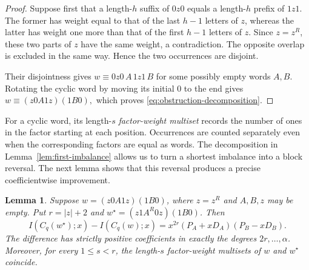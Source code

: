 \documentclass[11pt]{article}
\newtheorem{lemma}[lemma]{Lemma}
\theoremstyle{definition}
\begin{document}
\begin{proof}
Suppose first that a length-$h$ suffix of $0z0$ equals a length-$h$
prefix of $1z1$. The former has weight equal to that of the last
$h-1$ letters of $z$, whereas the latter has weight one more than
that of the first $h-1$ letters of $z$. Since $z=z^R$, these two
parts of $z$ have the same weight, a contradiction. The opposite
overlap is excluded in the same way. Hence the two occurrences are
disjoint.

Their disjointness gives
$
w\equiv 0z0\,A\,1z1\,B
$
for some possibly empty words $A,B$. Rotating the cyclic word by
moving its initial $0$ to the end gives
$
w\equiv (z0A1z)(1B0),
$
which proves \eqref{eq:obstruction-decomposition}.
\end{proof}

For a cyclic word, its length-$s$ \emph{factor-weight multiset}
records the number of ones in the factor starting at each position.
Occurrences are counted separately even when the corresponding
factors are equal as words.
The decomposition in Lemma~\ref{lem:first-imbalance} allows us to
turn a shortest imbalance into a block reversal. The next lemma
shows that this reversal produces a precise coefficientwise
improvement.

\begin{lemma}\label{lem:balancing-switch}
Suppose $w=(z0A1z)(1B0)$, where $z=z^R$ and $A,B,z$ may be empty.
Put $r=|z|+2$ and $w^\star=(z1A^R0z)(1B0)$. Then
\begin{equation}\label{eq:special-switch-gain}
 I(C_q(w^\star);x)-I(C_q(w);x)
 =x^{2r}(P_A+xD_A)(P_B-xD_B).
\end{equation}
The difference has strictly positive coefficients in exactly the
degrees $2r,\ldots,\alpha$. Moreover, for every $1\le s<r$, the
length-$s$ factor-weight multisets of $w$ and $w^\star$ coincide.
\end{lemma}
\end{document}

